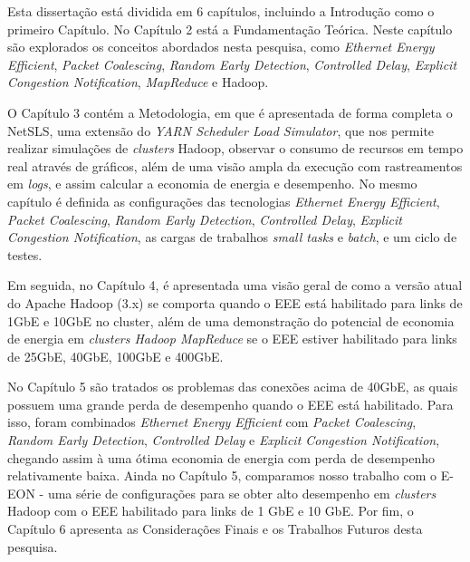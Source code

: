 Esta dissertação está dividida em 6 capítulos, incluindo a Introdução como o primeiro Capítulo. No Capítulo 2 está a Fundamentação Teórica. Neste capítulo são explorados os conceitos abordados nesta pesquisa, como \emph{Ethernet Energy Efficient}, \emph{Packet Coalescing}, \emph{Random Early Detection}, \emph{Controlled Delay}, \emph{Explicit Congestion Notification}, \emph{MapReduce} e Hadoop.

O Capítulo 3 contém a Metodologia, em que é apresentada de forma completa o NetSLS, uma extensão do \emph{YARN Scheduler Load Simulator}, que nos permite realizar simulações de \emph{clusters} Hadoop, observar o consumo de recursos em tempo real através de gráficos, além de uma visão ampla da execução com rastreamentos em \emph{logs}, e assim calcular a economia de energia e desempenho. No mesmo capítulo é definida as configurações das tecnologias \emph{Ethernet Energy Efficient}, \emph{Packet Coalescing}, \emph{Random Early Detection}, \emph{Controlled Delay}, \emph{Explicit Congestion Notification}, as cargas de trabalhos \emph{small tasks} e \emph{batch}, e um ciclo de testes.

Em seguida, no Capítulo 4, é apresentada uma visão geral de como a versão atual do Apache Hadoop (3.x) se comporta quando o EEE está habilitado para links de 1GbE e 10GbE no cluster, além de uma demonstração do potencial de economia de energia em \emph{clusters Hadoop MapReduce} se o EEE estiver habilitado para links de 25GbE, 40GbE, 100GbE e 400GbE.

No Capítulo 5 são tratados os problemas das conexões acima de 40GbE, as quais possuem uma grande perda de desempenho quando o EEE está habilitado. Para isso, foram combinados \emph{Ethernet Energy Efficient} com \emph{Packet Coalescing}, \emph{Random Early Detection}, \emph{Controlled Delay} e \emph{Explicit Congestion Notification}, chegando assim à uma ótima economia de energia com perda de desempenho relativamente baixa. Ainda no Capítulo 5, comparamos nosso trabalho com o E-EON - uma série de configurações para se obter alto desempenho em \emph{clusters} Hadoop com o EEE habilitado para links de 1 GbE e 10 GbE. Por fim, o Capítulo 6 apresenta as Considerações Finais e os Trabalhos Futuros desta pesquisa.

